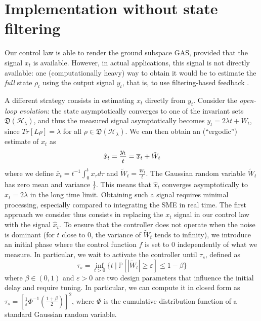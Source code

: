 \documentclass[conference]{IEEEtran}
\newcommand{\DHL}[1]{\mathfrak D(\mathcal H_{#1})}
\theoremstyle{plain}
\theoremstyle{plain}
\theoremstyle{plain}
\theoremstyle{plain}
\theoremstyle{remark}
\theoremstyle{definition}
\begin{document}
\section{Implementation without state filtering}
Our control law is able to render the ground subspace GAS, provided that the signal $x_t$ is available. However, in actual applications, this signal is not directly available: one (computationally heavy) way to obtain it would be to estimate the {\em full} state $\rho_t$ using the output signal $y_t$, that is, to use filtering-based feedback \cite{wisemanmilburn, AltafiniIntroduction2012}. 

A different strategy consists in estimating $x_t$ directly from $y_t$. Consider the {\em open-loop evolution}: the state asymptotically converges \cite{convergence} to one of the invariant sets $\DHL{\lambda}$, and thus the measured signal asymptotically becomes $y_t = 2\lambda t + W_t$, since $Tr[L\rho] = \lambda$ for all $\rho \in \DHL{\lambda}.$ We can then obtain an (``ergodic'') estimate of $x_t$ as \begin{equation}
    \hat x_t = \frac{y_t}{t} = \bar x_t + \tilde W_t
    \vspace{-3mm}
\end{equation}
where we define $\bar x_t=t^{-1}\int_0^tx_\tau d\tau$ and $\tilde W_t = \frac{W_t}{t}$. 
The Gaussian random variable $\tilde W_t$ has zero mean and variance $\frac{1}{t}$. This means that $\hat x_t$ converges asymptotically to $x_t=2\lambda$  in the long time limit. Obtaining such a signal requires minimal processing, especially compared to integrating the SME in real time.
The first approach we consider thus consists in replacing the $x_t$ signal in our control law with the signal $\hat x_t$. To ensure that the controller does not operate when the noise is dominant (for $t$ close to $0$, the variance of $\tilde W_t$ tends to infinity), we introduce an initial phase where the control function $f$ is set to $0$ independently of what we measure. In particular, we wait to activate the controller until $\tau_s$, defined as \begin{equation}
    \tau_s = \inf_{t > 0} \{t\ |\ \mathbb P[|\tilde W_t| \ge \varepsilon] \le 1 - \beta\} \label{taus}
\end{equation}
where $\beta \in (0, 1)$ and $\varepsilon > 0$ are two design parameters that influence the initial delay and require tuning. In particular, we can compute it in closed form as $\tau_s = \left[\frac{1}{\varepsilon}\Phi^{-1}\left(\frac{1 + \beta}{2}\right)\right]^2$, where $\Phi$ is the cumulative distribution function of a standard Gaussian random variable.
\end{document}

